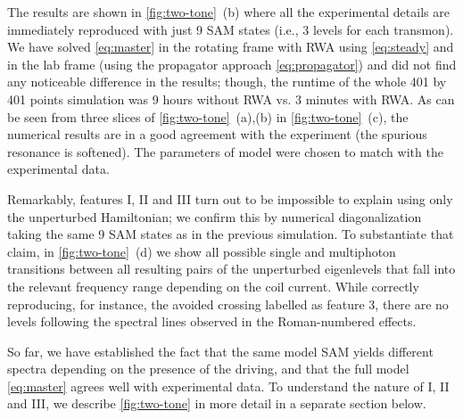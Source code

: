\documentclass[%
 aps, prx,
 amsmath,amssymb,
 reprint,%
superscriptaddress
]{revtex4-2}
\begin{document}
The results are shown in 
\autoref{fig:two-tone}~(b) where all the 
experimental details are immediately reproduced 
with just 9 SAM states (i.e., 3 levels for each 
transmon). We have solved \autoref{eq:master} in 
the rotating frame with RWA using 
\autoref{eq:steady} and in the lab frame (using 
the propagator approach \autoref{eq:propagator}) 
and did not find any noticeable difference in the 
results; though, the runtime of the whole 401 by 
401 points simulation was 9 hours without RWA vs. 
3 minutes with RWA. As can be seen from three 
slices of \autoref{fig:two-tone}~(a),(b) in 
\autoref{fig:two-tone}~(c), the numerical results 
are in a good agreement with the experiment (the 
spurious resonance is softened). The parameters 
of model were chosen to match with the 
experimental data.

Remarkably, features I, II and III turn out to be 
impossible to explain using only the unperturbed 
Hamiltonian; we confirm this by numerical 
diagonalization taking the same 9 SAM states as 
in the previous simulation. To substantiate that claim, in \autoref{fig:two-tone}~(d) we show all possible 
single and multiphoton transitions between all resulting pairs of the unperturbed eigenlevels that fall into the relevant frequency range depending on the coil current. While correctly reproducing, for 
instance, the avoided crossing labelled as 
feature 3, there are no levels following the spectral lines observed in the Roman-numbered effects. 

So far, we have established the fact that the 
same model SAM yields different spectra depending 
on the presence of the driving, and that the full 
model \autoref{eq:master} agrees well with 
experimental data. To understand the nature of I, 
II and III, we describe \autoref{fig:two-tone} in 
more detail in a separate section below.
\end{document}
